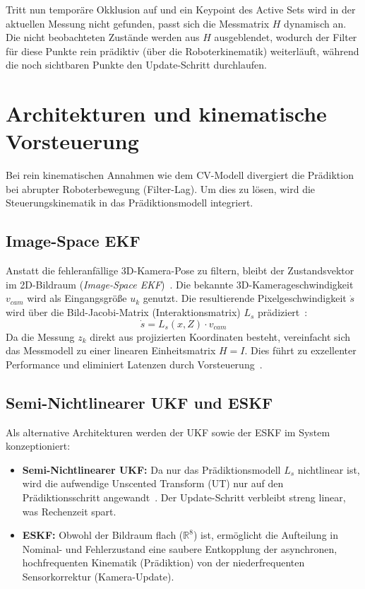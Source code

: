 Tritt nun temporäre Okklusion auf und ein Keypoint des Active Sets wird in der aktuellen Messung nicht gefunden, passt sich die Messmatrix $H$ dynamisch an. Die nicht beobachteten Zustände werden aus $H$ ausgeblendet, wodurch der Filter für diese Punkte rein prädiktiv (über die Roboterkinematik) weiterläuft, während die noch sichtbaren Punkte den Update-Schritt durchlaufen.

\section{Architekturen und kinematische Vorsteuerung}
\label{sec:ImageSpaceEKF}
Bei rein kinematischen Annahmen wie dem \ac{CV}-Modell divergiert die Prädiktion bei abrupter Roboterbewegung (Filter-Lag). Um dies zu lösen, wird die Steuerungskinematik in das Prädiktionsmodell integriert.

\subsection{Image-Space EKF}
Anstatt die fehleranfällige 3D-Kamera-Pose zu filtern, bleibt der Zustandsvektor im 2D-Bildraum (\textit{Image-Space \ac{EKF}})~\cite{comport2006real}. Die bekannte 3D-Kamerageschwindigkeit $v_{cam}$ wird als Eingangsgröße $u_k$ genutzt. Die resultierende Pixelgeschwindigkeit $\dot{s}$ wird über die Bild-Jacobi-Matrix (Interaktionsmatrix) $L_s$ prädiziert~\cite{chaumette2006visual}:
\begin{equation}
    \dot{s} = L_s(x, Z) \cdot v_{cam}
\end{equation}
Da die Messung $z_k$ direkt aus projizierten Koordinaten besteht, vereinfacht sich das Messmodell zu einer linearen Einheitsmatrix $H = I$. Dies führt zu exzellenter Performance und eliminiert Latenzen durch Vorsteuerung~\cite{corke1996dynamic}.

\subsection{Semi-Nichtlinearer UKF und ESKF}
Als alternative Architekturen werden der \ac{UKF} sowie der \ac{ESKF} im System konzeptioniert:
\begin{itemize}
    \item \textbf{Semi-Nichtlinearer UKF:} Da nur das Prädiktionsmodell $L_s$ nichtlinear ist, wird die aufwendige Unscented Transform (UT) nur auf den Prädiktionsschritt angewandt~\cite{wan2000unscented}. Der Update-Schritt verbleibt streng linear, was Rechenzeit spart.
    \item \textbf{ESKF:} Obwohl der Bildraum flach ($\mathbb{R}^8$) ist, ermöglicht die Aufteilung in Nominal- und Fehlerzustand eine saubere Entkopplung der asynchronen, hochfrequenten Kinematik (Prädiktion) von der niederfrequenten Sensorkorrektur (Kamera-Update).
\end{itemize}

